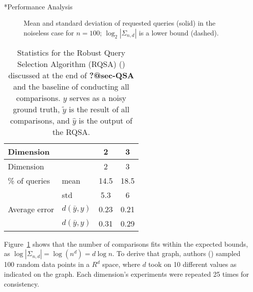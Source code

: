\documentclass[
  letterpaper,
  numbers=noenddot,
  DIV=11]{scrreprt}
\makeatletter
\let\oldparagraph\paragraph
\renewcommand{\paragraph}{
    \@ifstar
      \xxxParagraphStar
      \xxxParagraphNoStar
  }
\newcommand{\xxxParagraphStar}[1]{\oldparagraph*{#1}\mbox{}}
\newcommand{\xxxParagraphNoStar}[1]{\oldparagraph{#1}\mbox{}}
\theoremstyle{definition}
\theoremstyle{plain}
\theoremstyle{plain}
\theoremstyle{remark}
\makeatother
\begin{document}
\paragraph*{Performance Analysis}\label{sec-QSA}

\begin{figure}


\caption{\label{fig-rand_n}Mean and standard deviation of requested
queries (solid) in the noiseless case for \(n = 100\);
\(\log_2|\Sigma_{n,d}|\) is a lower bound (dashed).}

\end{figure}%

\begin{longtable}[]{@{}llcc@{}}
\caption{Statistics for the Robust Query Selection Algorithm (RQSA)
() discussed at the end of
\textbf{?@sec-QSA} and the baseline of conducting all comparisons. \(y\)
serves as a noisy ground truth, \(\tilde{y}\) is the result of all
comparisons, and \(\hat{y}\) is the output of the
RQSA.}\label{tbl-geo_acc}\tabularnewline
\toprule\noalign{}
Dimension & & 2 & 3 \\
\midrule\noalign{}
\endfirsthead
\toprule\noalign{}
Dimension & & 2 & 3 \\
\midrule\noalign{}
\endhead
\bottomrule\noalign{}
\endlastfoot
\% of queries & mean & 14.5 & 18.5 \\
& std & 5.3 & 6 \\
Average error & \(d(\bar{y}, y)\) & 0.23 & 0.21 \\
& \(d(\bar{y}, y)\) & 0.31 & 0.29 \\
\end{longtable}

Figure~\ref{fig-rand_n} shows that the number of comparisons fits within
the expected bounds, as \(\log|\Sigma_{n,d}| = \log(n^d) = d\log n\). To
derive that graph, authors ()
sampled 100 random data points in a \(R^d\) space, where \(d\) took on
10 different values as indicated on the graph. Each dimension's
experiments were repeated 25 times for consistency.
\end{document}
